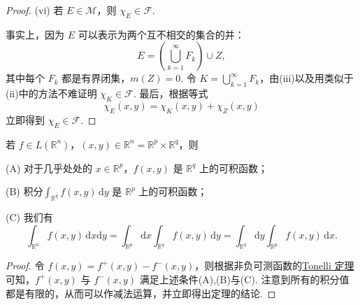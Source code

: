 \documentclass[../../main.tex]{subfiles}%
\begin{document}
\begin{proof}
(vi) 若 \( E \in \mathcal{M} \)，则 \( \chi_E \in \mathcal{F} \).

事实上，因为 \( E \) 可以表示为两个互不相交的集合的并：
\[
E = \left( \bigcup_{k = 1}^{\infty} F_k \right) \cup Z,
\]
其中每个 \( F_k \) 都是有界闭集，\( m(Z) = 0 \). 令 \( K = \bigcup_{k = 1}^{\infty} F_k \)，由(iii)以及用类似于(ii)中的方法不难证明 \( \chi_K \in \mathcal{F} \). 最后，根据等式
\[
\chi_E(x, y) = \chi_K(x, y) + \chi_Z(x, y)
\]
立即得到 \( \chi_E \in \mathcal{F} \).

\end{proof}

\begin{theorem}\label{theorem:Fubini定理 可积函数的情形}
若 \( f \in L(\mathbb{R}^n) \)，\( (x, y) \in \mathbb{R}^n = \mathbb{R}^p \times \mathbb{R}^q \)，则

(A) 对于几乎处处的 \( x \in \mathbb{R}^p \)，\( f(x, y) \) 是 \( \mathbb{R}^q \) 上的可积函数；

(B) 积分$\int_{\mathbb{R}^q} f(x, y) \, \mathrm{d}y$
是 \( \mathbb{R}^p \) 上的可积函数；

(C) 我们有
\[
\int_{\mathbb{R}^n} f(x, y) \, \mathrm{d}x\mathrm{d}y = \int_{\mathbb{R}^p} \mathrm{d}x \int_{\mathbb{R}^q} f(x, y) \, \mathrm{d}y = \int_{\mathbb{R}^q} \mathrm{d}y \int_{\mathbb{R}^p} f(x, y) \, \mathrm{d}x.
\]
\end{theorem}
\begin{proof}

令 \( f(x, y) = f^+(x, y) - f^-(x, y) \)，则根据非负可测函数的\hyperref[theorem:Tonelli 定理 非负可测函数的情形]{Tonelli 定理}可知，\( f^+(x, y) \) 与 \( f^-(x, y) \) 满足上述条件(A),(B)与(C). 注意到所有的积分值都是有限的，从而可以作减法运算，并立即得出定理的结论.

\end{proof}
\end{document}
